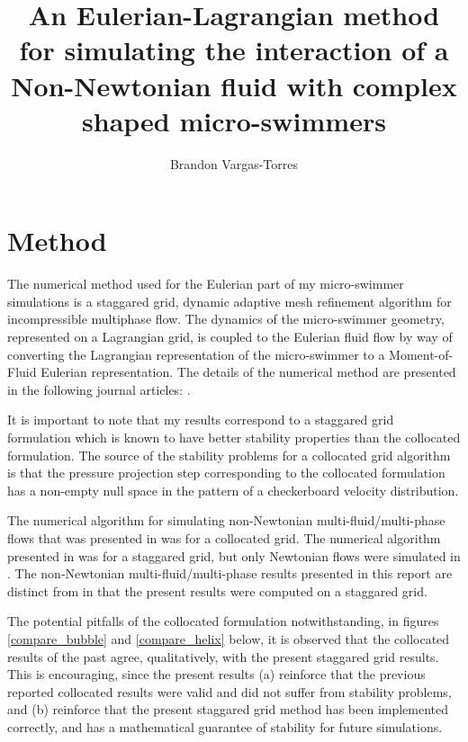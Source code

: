 \documentclass[]{article}
\title{An Eulerian-Lagrangian method for simulating the interaction of a 
 Non-Newtonian fluid with complex shaped micro-swimmers}
\author{Brandon Vargas-Torres}
\begin{document}
\maketitle
\vspace*{-10mm}
\section*{Method} 
The numerical method used for the Eulerian part of
my micro-swimmer simulations is a staggared
grid, dynamic adaptive mesh refinement algorithm for 
incompressible multiphase flow.  
The dynamics of the micro-swimmer geometry, represented on a 
Lagrangian grid, is coupled to the Eulerian fluid flow by way of converting
the Lagrangian representation of the micro-swimmer to a
Moment-of-Fluid Eulerian representation.  The details of the numerical method
are presented in the following journal articles: 
\cite{dyadechko2005moment,ArientiSussman2014,peihierarchical,OHTA201966}.

It is important to note that my results correspond to a staggared grid 
formulation which is known to have better stability properties than the
collocated formulation\cite{rhie1983numerical}.  
The source of the stability problems for a collocated grid algorithm
is that the pressure projection step corresponding
to the collocated formulation has a non-empty null space in the pattern of
a checkerboard velocity distribution.

The numerical algorithm
for simulating non-Newtonian multi-fluid/multi-phase flows that was
presented in \cite{OHTA201966} was for a collocated grid.  The numerical
algorithm presented in \cite{peihierarchical} was for a staggared grid,
but only Newtonian flows were simulated in \cite{peihierarchical}.
The non-Newtonian multi-fluid/multi-phase results presented in 
this report are distinct from \cite{OHTA201966}
in that the present results were computed on a staggared grid.

The potential pitfalls of the collocated formulation notwithstanding,
in figures \ref{compare_bubble} and
\ref{compare_helix} below, it is observed that the collocated results of the
past agree, qualitatively, with the present staggared grid results.  This
is encouraging, since the present results (a) reinforce that the previous 
reported collocated results were valid and did not suffer from stability 
problems, and (b) reinforce that the present staggared grid method has 
been implemented correctly, and has a mathematical guarantee of 
stability\cite{GUITTET2015215} for future simulations.
\end{document}
